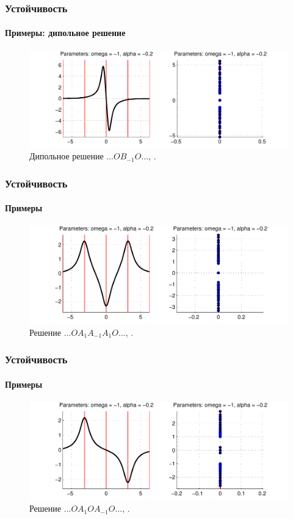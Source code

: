 \documentclass [10pt] {beamer}
\begin{document}
\begin{frame}
	\frametitle{Устойчивость}
	\framesubtitle{Примеры: дипольное решение}
	
	\begin{figure}
		\includegraphics[width=1\textwidth]{pic/example_2.pdf}
		\caption{Дипольное решение $\dots O B_{-1} O \dots$, {\it \color{forestgreen}{линейно устойчиво}}.}
		\label{pic:example_2}
	\end{figure}
\end{frame}

\begin{frame}
	\frametitle{Устойчивость}
	\framesubtitle{Примеры}
	
	\begin{figure}
		\includegraphics[width=1\textwidth]{pic/example_3.pdf}
		\caption{Решение $\dots O A_1 A_{-1} A_1 O \dots$, {\it \color{forestgreen}{линейно устойчиво}}.}
		\label{pic:example_3}
	\end{figure}
\end{frame}

\begin{frame}
	\frametitle{Устойчивость}
	\framesubtitle{Примеры}
	
	\begin{figure}
		\includegraphics[width=1\textwidth]{pic/example_4.pdf}
		\caption{Решение $\dots O A_1 O A_{-1} O \dots$, {\it \color{forestgreen}{линейно устойчиво}}.}
		\label{pic:example_4}
	\end{figure}
\end{frame}
\end{document}
